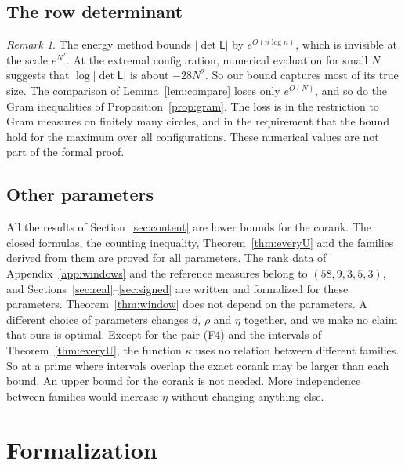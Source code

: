 \documentclass[11pt]{amsart}
\theoremstyle{definition}
\theoremstyle{remark}
\newtheorem{remark}[theorem]{Remark}
\numberwithin{equation}{section}
\begin{document}
\subsection{The row determinant}
\begin{remark}\label{rem:L}
The energy method bounds $|\det\mathsf L|$ by $e^{O(n\log n)}$, which is invisible at the scale $e^{N^2}$.
At the extremal configuration, numerical evaluation for small $N$ suggests that $\log|\det\mathsf L|$ is about
$-28N^2$. So our bound captures most of its true size. The comparison of Lemma~\ref{lem:compare} loses only
$e^{O(N)}$, and so do the Gram inequalities of Proposition~\ref{prop:gram}. The loss is in the restriction to
Gram measures on finitely many circles, and in the requirement that the bound hold for the maximum over
all configurations. These numerical values are not part of the formal proof.
\end{remark}

\subsection{Other parameters}
All the results of Section~\ref{sec:content} are lower bounds for the corank. The closed formulas, the
counting inequality, Theorem~\ref{thm:everyU} and the families derived from them are proved for all
parameters. The rank data of Appendix~\ref{app:windows} and the reference measures belong to $(58,9,3,5,3)$, and
Sections~\ref{sec:real}--\ref{sec:signed} are written and formalized for these parameters. Theorem~\ref{thm:window} does not depend on
the parameters. A different choice of parameters changes $d$, $\rho$ and $\eta$ together, and we make no claim
that ours is optimal. Except for the pair (F4) and the intervals of Theorem~\ref{thm:everyU}, the function
$\kappa$ uses no relation between different families. So at a prime where intervals overlap the exact corank
may be larger than each bound. An upper bound for the corank is not needed. More independence between
families would increase $\eta$ without changing anything else.

\section{Formalization}\label{sec:formal}
\end{document}
